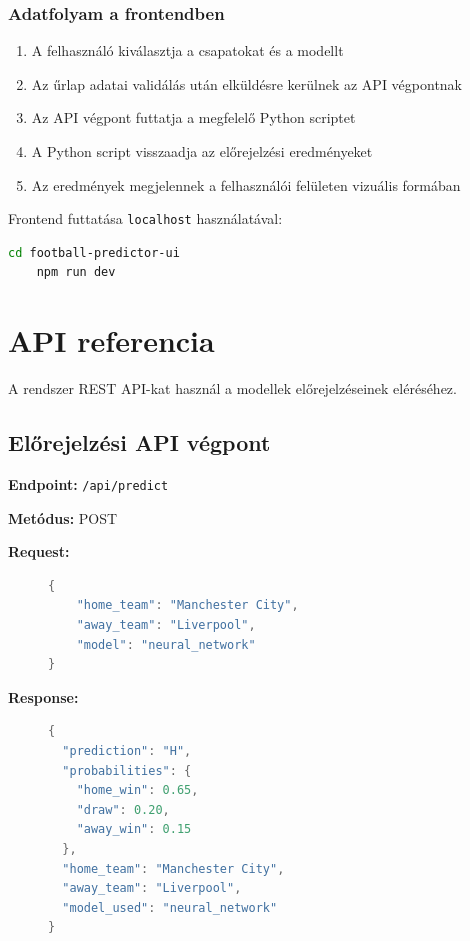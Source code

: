 \subsubsection{Adatfolyam a frontendben}

\begin{enumerate}
    \item A felhasználó kiválasztja a csapatokat és a modellt
    \item Az űrlap adatai validálás után elküldésre kerülnek az API végpontnak
    \item Az API végpont futtatja a megfelelő Python scriptet
    \item A Python script visszaadja az előrejelzési eredményeket
    \item Az eredmények megjelennek a felhasználói felületen vizuális formában
\end{enumerate}

Frontend futtatása \texttt{localhost} használatával:

\begin{lstlisting}[language=bash]
    cd football-predictor-ui
    npm run dev
\end{lstlisting}

\section{API referencia}

A rendszer REST API-kat használ a modellek előrejelzéseinek eléréséhez.

\subsection{Előrejelzési API végpont}

\textbf{Endpoint:} \texttt{/api/predict}

\textbf{Metódus:} POST

\textbf{Request:}

\begin{figure}[H]
    \begin{lstlisting}[language=Java]
{
    "home_team": "Manchester City",
    "away_team": "Liverpool",
    "model": "neural_network"
}
    \end{lstlisting}
\end{figure}


\textbf{Response:}

\begin{figure}[H]
    \begin{lstlisting}[language=Java]
{
  "prediction": "H",
  "probabilities": {
    "home_win": 0.65,
    "draw": 0.20,
    "away_win": 0.15
  },
  "home_team": "Manchester City",
  "away_team": "Liverpool",
  "model_used": "neural_network"
}
    \end{lstlisting}
\end{figure}


